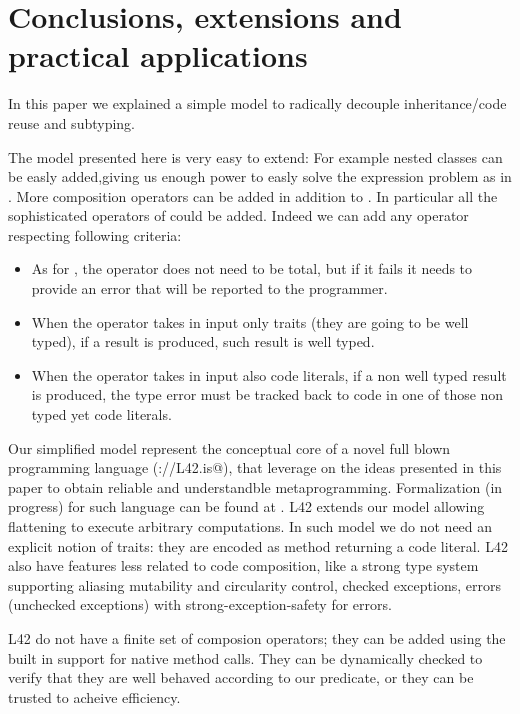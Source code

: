 \section{Conclusions, extensions and practical applications}

In this paper we explained a simple model to 
radically decouple inheritance/code reuse and subtyping.

The model presented here is very easy to extend:
For example nested classes can be easly added,giving us enough power to easly solve the expression problem as in \cite{deep}. More composition operators can be added in addition to \use.
In particular all the sophisticated operators of \cite{deep} could be added.
 Indeed we can add any operator respecting following criteria:

\begin{itemize}
\item As for \use, the operator does not need to be total, but if it fails it needs to provide an error that will be reported to the programmer.
\item When the operator takes in input only traits (they are going to be well typed), if a result is produced,
 such result is well typed.
\item When the operator takes in input also code literals, if a non well typed result is produced,
the type error must be tracked back to code in one of those non typed yet code literals.
 \end{itemize}
 

 
 Our simplified model represent the conceptual core of  a novel full blown programming language 
 (\verb@http://L42.is@),
that leverage on the ideas presented in this paper to obtain reliable and understandble metaprogramming.
Formalization (in progress) for such language can be found at 
\verb@urlOmittedForDoubleBlindReview@.
L42 extends our model allowing
flattening to execute arbitrary computations.
In such model we do not need an explicit notion of traits: they are encoded as method returning a code literal.
L42 also have features less related to code composition, like
  a strong type system supporting aliasing mutability and circularity control,
   checked exceptions, errors (unchecked exceptions) with strong-exception-safety for errors.

L42 do not have a finite set of composion operators; they can be added using the built in support for native method calls. They can be dynamically checked to verify that they are well behaved according to our predicate, or they can be trusted to acheive efficiency. 


